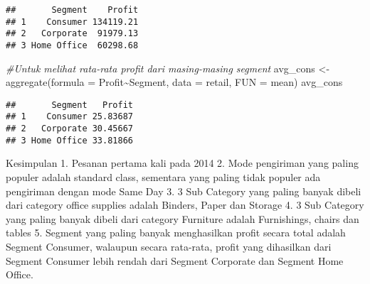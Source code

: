 \documentclass[
]{article}
\newenvironment{Shaded}{\begin{snugshade}}{\end{snugshade}}
\newcommand{\AttributeTok}[1]{\textcolor[rgb]{0.77,0.63,0.00}{#1}}
\newcommand{\CommentTok}[1]{\textcolor[rgb]{0.56,0.35,0.01}{\textit{#1}}}
\newcommand{\FunctionTok}[1]{\textcolor[rgb]{0.00,0.00,0.00}{#1}}
\newcommand{\NormalTok}[1]{#1}
\newcommand{\OtherTok}[1]{\textcolor[rgb]{0.56,0.35,0.01}{#1}}
\newcommand{\SpecialCharTok}[1]{\textcolor[rgb]{0.00,0.00,0.00}{#1}}
\begin{document}
\begin{verbatim}
##       Segment    Profit
## 1    Consumer 134119.21
## 2   Corporate  91979.13
## 3 Home Office  60298.68
\end{verbatim}

\begin{Shaded}
\begin{Highlighting}[]
\CommentTok{\#Untuk melihat rata{-}rata profit dari masing{-}masing segment}
\NormalTok{avg\_cons }\OtherTok{\textless{}{-}} \FunctionTok{aggregate}\NormalTok{(}\AttributeTok{formula =}\NormalTok{ Profit}\SpecialCharTok{\textasciitilde{}}\NormalTok{Segment, }\AttributeTok{data =}\NormalTok{ retail, }\AttributeTok{FUN =}\NormalTok{ mean)}
\NormalTok{avg\_cons}
\end{Highlighting}
\end{Shaded}

\begin{verbatim}
##       Segment   Profit
## 1    Consumer 25.83687
## 2   Corporate 30.45667
## 3 Home Office 33.81866
\end{verbatim}

Kesimpulan 1. Pesanan pertama kali pada 2014 2. Mode pengiriman yang
paling populer adalah standard class, sementara yang paling tidak
populer ada pengiriman dengan mode Same Day 3. 3 Sub Category yang
paling banyak dibeli dari category office supplies adalah Binders, Paper
dan Storage 4. 3 Sub Category yang paling banyak dibeli dari category
Furniture adalah Furnishings, chairs dan tables 5. Segment yang paling
banyak menghasilkan profit secara total adalah Segment Consumer,
walaupun secara rata-rata, profit yang dihasilkan dari Segment Consumer
lebih rendah dari Segment Corporate dan Segment Home Office.
\end{document}

